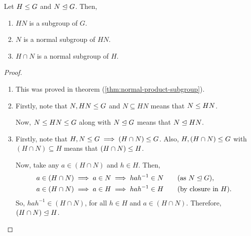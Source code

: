 \documentclass[11pt]{penrose}
\begin{document}
\begin{nlemma}
    Let $H \mathrel{\leq} G$ and $N \mathrel{\trianglelefteq} G$. Then,
    \begin{enumerate}
        \item $HN$ is a subgroup of $G$.
        \item $N$ is a normal subgroup of $HN$.
        \item $H \cap N$ is a normal subgroup of $H$.
    \end{enumerate}
\end{nlemma}
\begin{proof}\phantom{}
    \begin{enumerate}
        \item This was proved in theorem (\ref{thm:normal-product-subgroup}).

        \item Firstly, note that $N, HN \mathrel{\leq} G$ and $N \subseteq HN$ means that $N \mathrel{\leq} HN$.

        Now, $N \mathrel{\leq} HN \mathrel{\leq} G$ along with $N \mathrel{\trianglelefteq} G$ means that $N \mathrel{\trianglelefteq} HN$.

        \item Firstly, note that $H, N \mathrel{\leq} G \implies (H \cap N) \mathrel{\leq} G$. Also, $H, (H \cap N) \mathrel{\leq} G$ with $(H \cap N) \subseteq H$ means that $(H \cap N) \mathrel{\leq} H$.

        Now, take any $a \in (H \cap N)$ and $h \in H$. Then,
        \begin{align*}
            a \in (H \cap N) \implies a \in N &\implies h a h^{-1} \in N \qquad\text{(as $N \mathrel{\trianglelefteq} G$)},\\
            a \in (H \cap N) \implies a \in H &\implies h a h^{-1} \in H \qquad\text{(by closure in  $H$)}.
        \end{align*}
        So, $h a h^{-1} \in (H \cap N)$, for all $h \in H$ and $a \in (H \cap N)$. Therefore, $(H \cap N) \mathrel{\trianglelefteq} H$.
        \qedhere
    \end{enumerate}
\end{proof}
\end{document}
